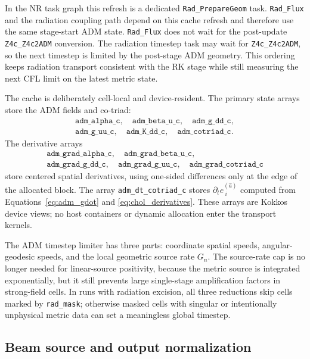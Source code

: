 \documentclass[11pt]{article}
\newcommand{\code}[1]{\texttt{#1}}
\begin{document}
In the NR task graph this refresh is a dedicated \code{Rad\_PrepareGeom} task.
\code{Rad\_Flux} and the radiation coupling path depend on this cache refresh
and therefore use the same stage-start ADM state.  \code{Rad\_Flux} does not
wait for the post-update \code{Z4c\_Z4c2ADM} conversion.  The radiation
timestep task may wait for \code{Z4c\_Z4c2ADM}, so the next timestep is limited
by the post-stage ADM geometry.  This ordering keeps radiation transport
consistent with the RK stage while still measuring the next CFL limit on the
latest metric state.

The cache is deliberately cell-local and device-resident.  The primary
state arrays store the ADM fields and co-triad:
\[
\begin{gathered}
\code{adm\_alpha\_c},\quad
\code{adm\_beta\_u\_c},\quad
\code{adm\_g\_dd\_c},\\
\code{adm\_g\_uu\_c},\quad
\code{adm\_K\_dd\_c},\quad
\code{adm\_cotriad\_c}.
\end{gathered}
\]
The derivative arrays
\[
\begin{gathered}
\code{adm\_grad\_alpha\_c},\quad
\code{adm\_grad\_beta\_u\_c},\\
\code{adm\_grad\_g\_dd\_c},\quad
\code{adm\_grad\_g\_uu\_c},\quad
\code{adm\_grad\_cotriad\_c}
\end{gathered}
\]
store centered spatial derivatives, using one-sided differences only at the
edge of the allocated block.  The array \code{adm\_dt\_cotriad\_c} stores
\(\partial_t e^{(\hat a)}_{\ i}\) computed from Equations~\eqref{eq:adm_gdot}
and \eqref{eq:chol_derivatives}.  These arrays are Kokkos device views; no
host containers or dynamic allocation enter the transport kernels.

The ADM timestep limiter has three parts: coordinate spatial speeds,
angular-geodesic speeds, and the local geometric source rate \(G_n\).  The
source-rate cap is no longer needed for linear-source positivity, because the
metric source is integrated exponentially, but it still prevents large
single-stage amplification factors in strong-field cells.  In runs with
radiation excision, all three reductions skip cells marked by \code{rad\_mask};
otherwise masked cells with singular or intentionally unphysical metric data
can set a meaningless global timestep.

\subsection{Beam source and output normalization}
\end{document}
